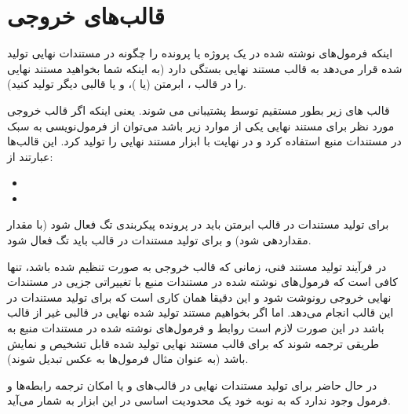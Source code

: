 



\section{قالب‌های خروجی}
اینکه  فرمول‌های نوشته شده در یک پروژه یا پرونده را چگونه در مستندات
نهایی تولید شده قرار می‌دهد به قالب مستند نهایی بستگی دارد (به اینکه شما بخواهید
مستند نهایی را در قالب \lr{\LaTeX}، ابرمتن (یا )،  و یا قالبی
دیگر تولید کنید).

قالب های زیر بطور مستقیم توسط  پشتیبانی می شوند. یعنی اینکه اگر قالب
خروجی مورد نظر برای مستند نهایی یکی از موارد زیر باشد می‌توان از فرمول‌نویسی به
سبک \lr{\LaTeX} در مستندات منبع استفاده کرد و در نهایت با ابزار 
مستند نهایی را تولید کرد. این قالب‌ها عبارتند از:

\begin{itemize}
	\item {}
	\item {}
\end{itemize}

برای تولید مستندات در قالب ابرمتن باید در پرونده پیکربندی تگ 
فعال شود (با مقدار  مقداردهی شود) و برای تولید مستندات در قالب
\lr{\LaTeX} باید تگ  فعال شود.

در فرآیند تولید مستند فنی، زمانی که قالب خروجی به صورت \lr{\LaTeX} تنظیم
شده باشد، تنها کافی است که فرمول‌های نوشته شده در مستندات منبع با تغییراتی
جزیی در مستندات نهایی خروجی رونوشت شود و این دقیقا همان کاری است که
 برای تولید مستندات در این قالب انجام می‌دهد. اما اگر بخواهیم مستند
تولید شده نهایی در قالبی غیر از قالب  \lr{\LaTeX} باشد در این صورت لازم است
روابط و فرمول‌های نوشته شده در مستندات منبع به طریقی ترجمه شوند که برای قالب
مستند نهایی تولید شده قابل تشخیص و نمایش باشد (به عنوان مثال فرمول‌ها به عکس
تبدیل شوند).

\begin{note}
در حال حاضر برای تولید مستندات نهایی در قالب‌های  و یا 
امکان ترجمه رابطه‌ها و فرمول وجود ندارد که به نوبه خود یک محدودیت اساسی در این ابزار به شمار می‌آید.
\end{note}

